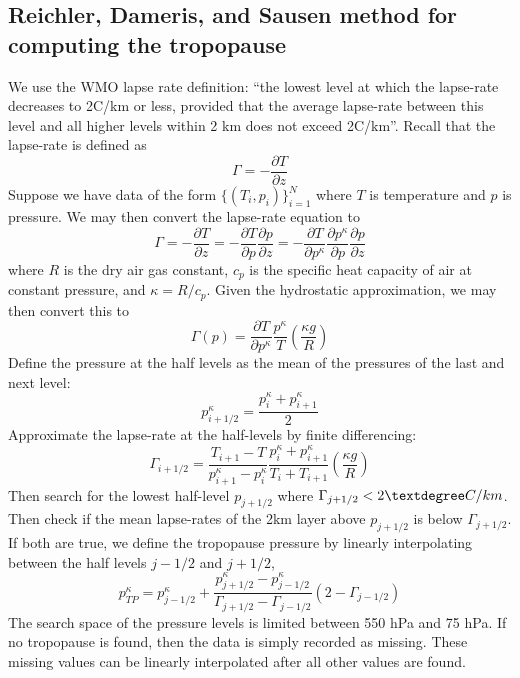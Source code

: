 \documentclass[fleqn,10pt]{wlscirep}
\begin{document}
\subsection*{Reichler, Dameris, and Sausen method for computing the tropopause\cite{reichler2003determining}}
We use the WMO lapse rate definition: ``the lowest level at which the lapse-rate decreases to 2\textdegree C/km
or less, provided that the average lapse-rate between this level
and all higher levels within 2 km does not exceed 2\textdegree C/km''. Recall that the lapse-rate is defined as
\[\Gamma = -\frac{\partial T}{\partial z}\]
Suppose we have data of the form $\{(T_i, p_i)\}^{N}_{i=1}$ where $T$ is temperature and $p$ is pressure. We may then convert the lapse-rate equation to 
\[\Gamma = -\frac{\partial T}{\partial z} = -\frac{\partial T}{\partial p}\frac{\partial p}{\partial z} = -\frac{\partial T}{\partial p^\kappa}\frac{\partial p^\kappa}{\partial p}\frac{\partial p}{\partial z}\]
where $R$ is the dry air gas constant, $c_p$ is the specific heat capacity of air at constant pressure, and $\kappa = R/c_p$. Given the hydrostatic approximation, we may then convert this to 
\[\Gamma(p) = \frac{\partial T}{\partial p^\kappa}\frac{p^\kappa}{T}\left(\frac{\kappa g}{R}\right)\]
Define the pressure at the half levels as the mean of the pressures of the last and next level:
\[p^{\kappa}_{i+1/2} = \frac{p^\kappa_i + p^\kappa_{i+1}}{2}\]
Approximate the lapse-rate at the half-levels by finite differencing:
\[\Gamma_{i+1/2} = \frac{T_{i+1} - T}{p^\kappa_{i+1} - p^\kappa_{i}}\frac{p^\kappa_i + p^\kappa_{i+1}}{T_i + T_{i+1}}\left(\frac{\kappa g}{R}\right)\]
Then search for the lowest half-level $p_{j+1/2}$ where $\Gamma_{j+1/2} < 2 \textdegree C/km$. Then check if the mean lapse-rates of the 2km layer above $p_{j+1/2}$ is below $\Gamma_{j+1/2}$. If both are true, we define the tropopause pressure by linearly interpolating between the half levels $j-1/2$ and $j+1/2$,
\[p_{TP}^\kappa = p^\kappa_{j-1/2} + \frac{p^\kappa_{j+1/2} - p^\kappa_{j-1/2}}{\Gamma_{j+1/2} - \Gamma_{j-1/2}}(2 - \Gamma_{j-1/2})\]
The search space of the pressure levels is limited between 550 hPa and 75 hPa. If no tropopause is found, then the data is simply recorded as missing. These missing values can be linearly interpolated after all other values are found. 
\end{document}
